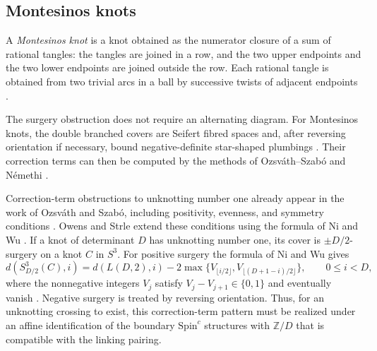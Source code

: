 \documentclass[12pt, oneside]{amsart}
\newcommand{\bbz}{{\mathbb Z}}
\begin{document}
\subsection{Montesinos knots}\label{sec:montesinos}

A \emph{Montesinos knot} is a knot obtained as the numerator closure of a sum of rational
tangles: the tangles are joined in a row, and the two upper endpoints and the two lower
endpoints are joined outside the row. Each rational tangle is obtained from two trivial
arcs in a ball by successive twists of adjacent endpoints \cite[Def.~4.1 and Fig.~3]{MO}.

The surgery obstruction does not require an alternating diagram. For Montesinos knots,
the double branched covers are Seifert fibred spaces and, after reversing orientation
if necessary, bound negative-definite star-shaped plumbings \cite[\S4.1]{MO}.
Their correction terms can then be computed by the methods of
Ozsv\'ath--Szab\'o and N\'emethi \cite{OSplumbed,Nemethi}.

Correction-term obstructions to unknotting number one already appear in the work of
Ozsv\'ath and Szab\'o, including positivity, evenness, and symmetry conditions
\cite[Thm.~1.1 and \S8.4]{OS05}. Owens and Strle extend these conditions using the
formula of Ni and Wu \cite[Thm.~3 and its proof]{OwensStrle}.
If a knot of determinant $D$ has unknotting number one, its cover is
$\pm D/2$-surgery on a knot $C$ in $S^3$. For positive surgery the formula of Ni and Wu
\cite[Prop.~1.6 and Rem.~2.10]{NiWu} gives
\begin{equation}\label{eq:niwu}
 d(S^3_{D/2}(C),i)=d(L(D,2),i)
 -2\max\{V_{\lfloor i/2\rfloor},V_{\lfloor(D+1-i)/2\rfloor}\},
 \qquad 0\le i<D,
\end{equation}
where the nonnegative integers $V_j$ satisfy $V_j-V_{j+1}\in\{0,1\}$ and eventually
vanish \cite{NiWu}. Negative surgery is treated by reversing orientation. Thus, for an unknotting crossing to exist, this correction-term pattern must be
realized under an affine identification of the boundary $\mathrm{Spin}^c$ structures
with $\bbz/D$ that is compatible with the linking pairing.
\end{document}
